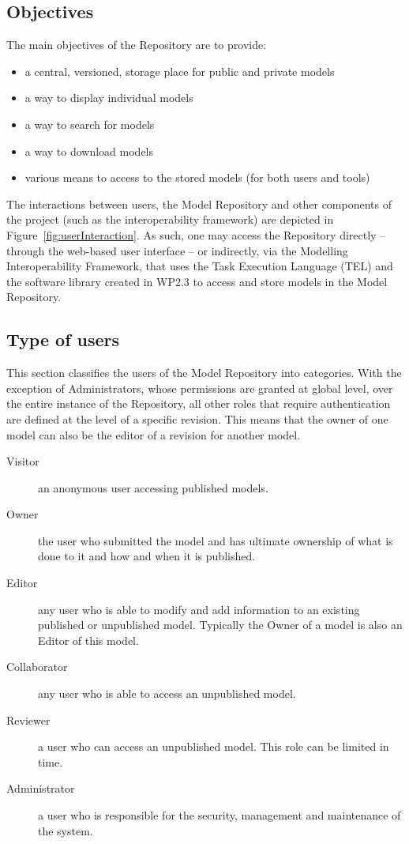 \subsection{Objectives}
\label{objectives}
The main objectives of the Repository are to provide:
\begin{itemize}
  \item a central, versioned, storage place for public and private models
  \item a way to display individual models
  \item a way to search for models
  \item a way to download models
  \item various means to access to the stored models (for both users and tools)
\end{itemize}

The interactions between users, the Model Repository and other components of the project (such as the interoperability framework) are depicted in Figure~\ref{fig:userInteraction}. As such, one may access the Repository directly -- through the web-based user interface -- or indirectly, via the Modelling Interoperability Framework, that uses the Task Execution Language (TEL) and the software library created in WP2.3 to access and store models in the \ddmore Model Repository.


\subsection{Type of users}
\label{users}
This section classifies the users of the \ddmore Model Repository into categories. With the exception of Administrators, whose permissions are granted at global level, over the entire instance of the Repository, all other roles that require authentication are defined at the level of a specific revision. This means that the owner of one model can also be the editor of a revision for another model. 

\begin{description}
  \item[Visitor] an anonymous user accessing \glspl{published model}.
  \item[Owner] the user who submitted the model and has ultimate ownership of what is done to it and how and
when it is published.
  \item[Editor] any user who is able to modify and add information to an existing published or \gls{unpublished model}. Typically the Owner of a model is also an Editor of this model.
  \item[Collaborator] any user who is able to access an unpublished model.
  \item[Reviewer] a user who can access an unpublished model. This role can be limited in time.
  \item[Administrator] a user who is responsible for the security, management and maintenance of the system.
\end{description}

